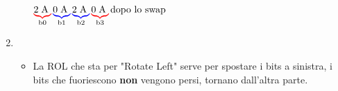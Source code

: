 \documentclass[a4paper, 12pt]{article} %
\begin{document}
\begin{enumerate}
\begin{itemize}
		$ \color{red}\underbrace{\normalcolor2\hspace{0.1cm}\text{A}\hspace{0.1cm}} _{\normalcolor\text{b0}} \color{blue}\underbrace{\normalcolor0\hspace{0.1cm}\text{A}\hspace{0.1cm}} _{\normalcolor\text{b1}} \color{blue}\underbrace{\normalcolor2\hspace{0.1cm}\text{A}\hspace{0.1cm}} _{\normalcolor\text{b2}} \color{red}\underbrace{\normalcolor0\hspace{0.1cm}\text{A}\hspace{0.1cm}} _{\normalcolor\text{b3}} \text{\normalcolor dopo lo swap}$ \\
	\end{itemize}
	\pagebreak
	\item {} \\
	\begin{itemize}
		\item\textsf{\small La ROL che sta per "Rotate Left" serve per spostare i bits a sinistra, i bits che fuoriescono \textbf {non }vengono persi, tornano dall'altra parte.} \\

\end{itemize}
\end{enumerate}
\end{document}
